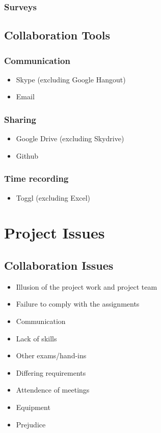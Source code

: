 \subsubsection {Surveys}


\subsection{Collaboration Tools}

\subsubsection {Communication}
	\begin{itemize}
		\item Skype (excluding Google Hangout)
		\item Email
	\end{itemize}
\subsubsection {Sharing}
	\begin{itemize}
		\item Google Drive (excluding Skydrive)
		\item Github
	\end{itemize}
\subsubsection {Time recording}
	\begin{itemize}
		\item Toggl (excluding Excel)
	\end{itemize}



\section{Project Issues}

\subsection{Collaboration Issues}

	\begin{itemize}

		\item Illusion of the project work and project team
		\item Failure to comply with the assignments
		\item Communication
		\item Lack of skills
		\item Other exams/hand-ins
		\item Differing requirements
		\item Attendence of meetings
		\item Equipment
		\item Prejudice
	\end{itemize}

